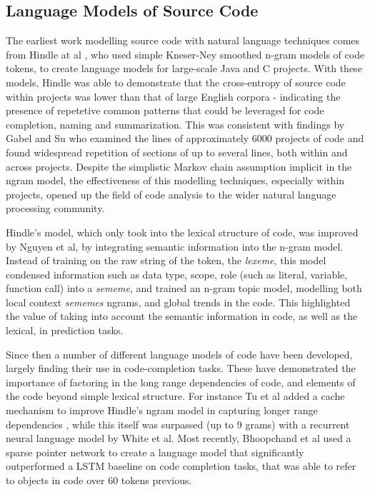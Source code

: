 \subsection{Language Models of Source Code}

The earliest work modelling source code with natural language techniques comes from Hindle at al \cite{Hindle:2012:NS:2337223.2337322}, who used simple Kneser-Ney smoothed n-gram models of code tokens, to create language models for large-scale Java and C projects.
With these models, Hindle was able to demonstrate that the cross-entropy of source code within projects was lower than that of large English corpora - indicating the presence of repetetive common patterns that could be leveraged for code completion, naming and summarization.
This was consistent with findings by Gabel and Su \cite{gabel_study_2010} who examined the lines of approximately 6000 projects of code and found widespread repetition of sections of up to several lines, both within and across projects.
Despite the simplistic Markov chain assumption implicit in the ngram model, the effectiveness of this modelling techniques, especially within projects, opened up the field of code analysis to the wider natural language processing community.

Hindle's model, which only took into the lexical structure of code, was improved by Nguyen et al\cite{nguyen_statistical_2013}, by integrating semantic information into the n-gram model.
Instead of training on the raw string of the token, the \textit{lexeme}, this model condensed information such as data type, scope, role (such as literal, variable, function call) into a \textit{sememe}, and trained an n-gram topic model, modelling both local context \textit{sememes} ngrams, and global trends in the code.
This highlighted the value of taking into account the semantic information in code, as well as the lexical, in prediction tasks.

Since then a number of different language models of code have been developed, largely finding their use in code-completion tasks. These have demonstrated the importance of factoring in the long range dependencies of code, and elements of the code beyond simple lexical structure. For instance Tu et al added a cache mechanism to improve Hindle's ngram model in capturing longer range dependencies  \cite{tu_localness_nodate}, while this itself was surpassed (up to 9 grams) with a recurrent neural language model by White et al\cite{white_toward_2015}.
Most recently, Bhoopchand et al used a sparse pointer network to create a language model that significantly outperformed a LSTM baseline on code completion tasks, that was able to refer to objects in code over 60 tokens previous\cite{bhoopchand_learning_2016}.

